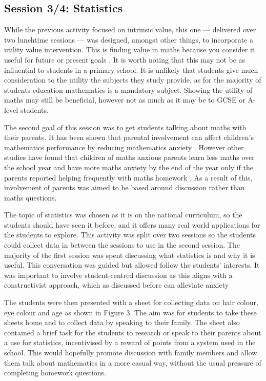 \documentclass[11pt, a4paper, notitlepage]{article}
\begin{document}
\subsection{Session 3/4: Statistics}

While the previous activity focused on intrinsic value, this one --- delivered over two lunchtime sessions --- was designed, amongst other things, to incorporate a utility value intervention. This is finding value in maths because you consider it useful for future or present goals \cite{MAES:2024}. It is worth noting that this may not be as influential to students in a primary school. It is unlikely that students give much consideration to the utility the subjects they study provide, as for the majority of students education mathematics is a mandatory subject. Showing the utility of maths may still be beneficial, however not as much as it may be to GCSE or A-level students.
\par
The second goal of this session was to get students talking about maths with their parents. It has been shown that parental involvement can affect children's mathematics performance by reducing mathematics anxiety \cite{Vukovic01052013}. However other studies have found that children of maths anxious parents learn less maths over the school year and have more maths anxiety by the end of the year only if the parents reported helping frequently with maths homework \cite{Maloney:2015}. As a result of this, involvement of parents was aimed to be based around discussion rather than maths questions.
\par
The topic of statistics was chosen as it is on the national curriculum, so the students should have seen it before, and it offers many real world applications for the students to explore. This activity was split over two sessions so the students could collect data in between the sessions to use in the second session. The majority of the first session was spent discussing what statistics is and why it is useful. This conversation was guided but allowed follow the students' interests. It was important to involve student-centred discussion as this aligns with a constructivist approach, which as discussed before can alleviate anxiety \cite{Finlayson:2014}
\par
 The students were then presented with a sheet for collecting data on hair colour, eye colour and age as shown in Figure 3. 
The aim was for students to take these sheets home and to collect data by speaking to their family. The sheet also contained a brief task for the students to research or speak to their parents about a use for statistics, incentivised by a reward of points from a system used in the school. This would hopefully promote discussion with family members and allow them talk about mathematics in a more casual way, without the usual pressure of completing homework questions.
\end{document}
